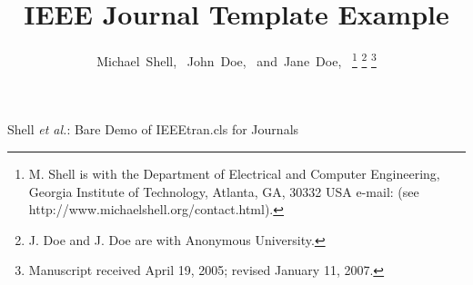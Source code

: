 \documentclass[journal]{IEEEtran}
\begin{document}
    \title{IEEE Journal Template Example}

    \author{Michael~Shell,~
    John~Doe,~
    and~Jane~Doe,~%
    \thanks{M. Shell is with the Department
    of Electrical and Computer Engineering, Georgia Institute of Technology, Atlanta,
    GA, 30332 USA e-mail: (see http://www.michaelshell.org/contact.html).}%
    \thanks{J. Doe and J. Doe are with Anonymous University.}%
    \thanks{Manuscript received April 19, 2005; revised January 11, 2007.}}




    {Shell \MakeLowercase{\textit{et al.}}: Bare Demo of IEEEtran.cls for Journals}
\end{document}
